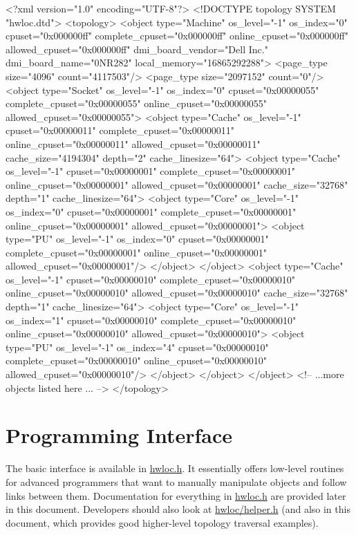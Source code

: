 \begin{DoxyVerb}
<?xml version="1.0" encoding="UTF-8"?>
<!DOCTYPE topology SYSTEM "hwloc.dtd">
<topology>
  <object type="Machine" os_level="-1" os_index="0" cpuset="0x000000ff" 
      complete_cpuset="0x000000ff" online_cpuset="0x000000ff" 
      allowed_cpuset="0x000000ff" dmi_board_vendor="Dell Inc." 
      dmi_board_name="0NR282" local_memory="16865292288">
    <page_type size="4096" count="4117503"/>
    <page_type size="2097152" count="0"/>
    <object type="Socket" os_level="-1" os_index="0" cpuset="0x00000055" 
        complete_cpuset="0x00000055" online_cpuset="0x00000055" 
        allowed_cpuset="0x00000055">
      <object type="Cache" os_level="-1" cpuset="0x00000011" 
          complete_cpuset="0x00000011" online_cpuset="0x00000011" 
          allowed_cpuset="0x00000011" cache_size="4194304" depth="2" 
          cache_linesize="64">
        <object type="Cache" os_level="-1" cpuset="0x00000001" 
            complete_cpuset="0x00000001" online_cpuset="0x00000001" 
            allowed_cpuset="0x00000001" cache_size="32768" depth="1" 
            cache_linesize="64">
          <object type="Core" os_level="-1" os_index="0" cpuset="0x00000001" 
              complete_cpuset="0x00000001" online_cpuset="0x00000001" 
              allowed_cpuset="0x00000001">
            <object type="PU" os_level="-1" os_index="0" cpuset="0x00000001" 
                complete_cpuset="0x00000001" online_cpuset="0x00000001" 
                allowed_cpuset="0x00000001"/>
          </object>
        </object>
        <object type="Cache" os_level="-1" cpuset="0x00000010" 
            complete_cpuset="0x00000010" online_cpuset="0x00000010" 
            allowed_cpuset="0x00000010" cache_size="32768" depth="1" 
            cache_linesize="64">
          <object type="Core" os_level="-1" os_index="1" cpuset="0x00000010" 
              complete_cpuset="0x00000010" online_cpuset="0x00000010" 
              allowed_cpuset="0x00000010">
            <object type="PU" os_level="-1" os_index="4" cpuset="0x00000010" 
                complete_cpuset="0x00000010" online_cpuset="0x00000010" 
                allowed_cpuset="0x00000010"/>
          </object>
        </object>
      </object>
  <!-- ...more objects listed here ... -->
</topology>
\end{DoxyVerb}


\hypertarget{index_interface}{}\section{Programming Interface}\label{index_interface}
The basic interface is available in \hyperlink{a00033_source}{hwloc.h}. It essentially offers low-\/level routines for advanced programmers that want to manually manipulate objects and follow links between them. Documentation for everything in \hyperlink{a00033_source}{hwloc.h} are provided later in this document. Developers should also look at \hyperlink{a00031_source}{hwloc/helper.h} (and also in this document, which provides good higher-\/level topology traversal examples).

